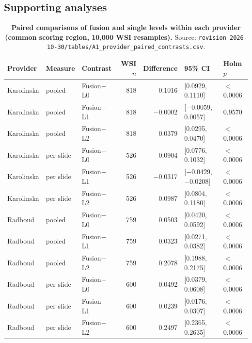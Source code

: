\documentclass[10pt]{article}
\begin{document}
\subsection*{Supporting analyses}
\begin{table}[H]\centering\footnotesize
\caption{\textbf{Paired comparisons of fusion and single levels within each provider (common scoring region, 10,000 WSI resamples).} Source: \texttt{revision\_2026-10-30/tables/A1\_provider\_paired\_contrasts.csv}.}
\begin{tabular}{lllrrll}\toprule
Provider & Measure & Contrast & WSI $n$ & Difference & 95\% CI & Holm $p$\\\midrule
Karolinska & pooled & Fusion$-$L0 & 818 & 0.1016 & [0.0929, 0.1110] & $<$0.0006\\
Karolinska & pooled & Fusion$-$L1 & 818 & $-$0.0002 & [$-$0.0059, 0.0057] & 0.9570\\
Karolinska & pooled & Fusion$-$L2 & 818 & 0.0379 & [0.0295, 0.0470] & $<$0.0006\\
Karolinska & per slide & Fusion$-$L0 & 526 & 0.0904 & [0.0776, 0.1032] & $<$0.0006\\
Karolinska & per slide & Fusion$-$L1 & 526 & $-$0.0317 & [$-$0.0429, $-$0.0208] & $<$0.0006\\
Karolinska & per slide & Fusion$-$L2 & 526 & 0.0987 & [0.0804, 0.1180] & $<$0.0006\\
Radboud & pooled & Fusion$-$L0 & 759 & 0.0503 & [0.0420, 0.0592] & $<$0.0006\\
Radboud & pooled & Fusion$-$L1 & 759 & 0.0323 & [0.0271, 0.0382] & $<$0.0006\\
Radboud & pooled & Fusion$-$L2 & 759 & 0.2078 & [0.1988, 0.2175] & $<$0.0006\\
Radboud & per slide & Fusion$-$L0 & 600 & 0.0492 & [0.0379, 0.0608] & $<$0.0006\\
Radboud & per slide & Fusion$-$L1 & 600 & 0.0239 & [0.0176, 0.0307] & $<$0.0006\\
Radboud & per slide & Fusion$-$L2 & 600 & 0.2497 & [0.2365, 0.2635] & $<$0.0006\\
\bottomrule\end{tabular}\end{table}
\end{document}
